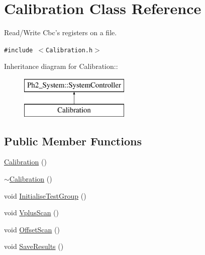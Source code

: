 \hypertarget{class_calibration}{
\section{Calibration Class Reference}
\label{class_calibration}
}
Read/Write Cbc's registers on a file.  


{\tt \#include $<$Calibration.h$>$}

Inheritance diagram for Calibration::\begin{figure}[H]
\begin{center}
\leavevmode
\includegraphics[height=2cm]{class_calibration}
\end{center}
\end{figure}
\subsection*{Public Member Functions}
\begin{CompactItemize}
\item 
\hyperlink{class_calibration_80f51a5ff7ec0f44d5388c9a61d1f20b}{Calibration} ()
\item 
\hyperlink{class_calibration_108efb6ccd8c98e5cac950be4bf0ac26}{$\sim$Calibration} ()
\item 
void \hyperlink{class_calibration_0d38b6198cd798ed2a2d3dceec93e6e1}{Initialise\-Test\-Group} ()
\item 
void \hyperlink{class_calibration_22a49d922a44c44eb1c5a7222c80e61a}{Vplus\-Scan} ()
\item 
void \hyperlink{class_calibration_90a0ab6faea40d474217ba5ab2c4d07f}{Offset\-Scan} ()
\item 
void \hyperlink{class_calibration_e154696d09e1b201ff1a28d99f2ed7a9}{Save\-Results} ()
\end{CompactItemize}
